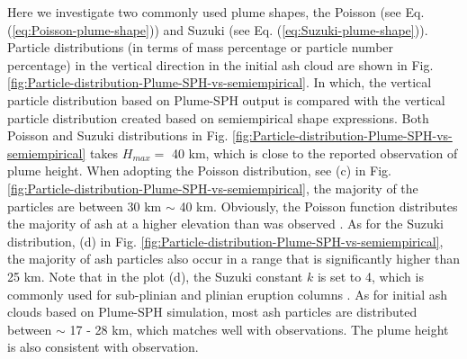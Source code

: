 \documentclass[utf8]{frontiersSCNS} %
\begin{document}
Here we investigate two commonly used plume shapes, the Poisson (see Eq. (\ref{eq:Poisson-plume-shape})) and Suzuki (see Eq. (\ref{eq:Suzuki-plume-shape})).
Particle distributions (in terms of mass percentage or particle number percentage) in the vertical direction in the initial ash cloud are shown in Fig. \ref{fig:Particle-distribution-Plume-SPH-vs-semiempirical}. In which, the vertical particle distribution based on Plume-SPH output is compared with the vertical particle distribution created based on semiempirical shape expressions. Both Poisson and Suzuki distributions in Fig. \ref{fig:Particle-distribution-Plume-SPH-vs-semiempirical} takes $H_{max} =$ 40 km, which is close to the reported observation of plume height. When adopting the Poisson distribution, see (c) in  Fig. \ref{fig:Particle-distribution-Plume-SPH-vs-semiempirical}, the majority of the particles are between 30 km $\sim$ 40 km. Obviously, the Poisson function distributes the majority of ash at a higher elevation than was observed \citep[e.g.][]{fero2008simulation}. As for the Suzuki distribution, (d) in  Fig. \ref{fig:Particle-distribution-Plume-SPH-vs-semiempirical}, the majority of ash particles also occur in a range that is significantly higher than 25 km. Note that in the plot (d), the Suzuki constant $k$ is set to 4, which is commonly used for sub-plinian and plinian eruption columns \citep{pfeiffer2005model}. As for initial ash clouds based on Plume-SPH simulation, most ash particles are distributed between $\sim$ 17 - 28 km, which matches well with observations. The plume height is also consistent with observation.
\end{document}
